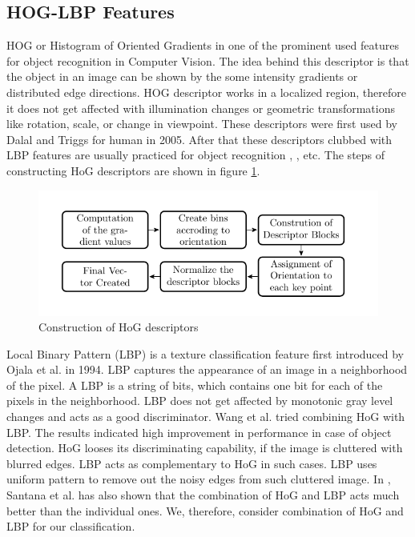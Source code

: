 \subsection{HOG-LBP Features}
 HOG or Histogram of Oriented Gradients in one of the prominent used features for object recognition in Computer Vision. The idea behind this descriptor is that the object in an image can be shown by the some intensity gradients or distributed edge directions. HOG descriptor works in a localized region, therefore it does not get affected with illumination changes or geometric transformations like rotation, scale, or change in viewpoint. These descriptors were first used by Dalal and Triggs \cite{HOG} for human in 2005. After that these descriptors clubbed with LBP features are usually practiced for object recognition \cite{hog1}, \cite{hog2},\cite{hog3} etc. The steps of constructing HoG descriptors are shown in figure \ref{fig:hogProcess}.
 \begin{center}
\begin{figure}
\includegraphics[width=\linewidth]{./Pictures/HOG/hogProcess.jpg}
\caption{Construction of HoG descriptors }
\label{fig:hogProcess}
\end{figure}
\end{center}
Local Binary Pattern (LBP) is a texture classification feature first introduced by Ojala et al. \cite{ojala} in 1994. LBP captures the appearance of an image in a neighborhood of the pixel. A LBP is a string of bits, which contains one bit for each of the pixels in
the neighborhood. LBP does not get affected by monotonic gray level changes and acts as a good discriminator. Wang et al. \cite{wangHOG} tried combining HoG with LBP. The results indicated high improvement in performance in case of object detection. HoG looses its discriminating capability, if the image is cluttered with blurred edges. LBP acts as complementary to HoG in such cases. LBP uses uniform pattern to remove out the noisy edges from such cluttered image. In \cite{santana}, Santana et al. has also shown that the combination of HoG and LBP acts much better than the individual ones. We, therefore, consider combination of HoG and LBP for our classification. \\
